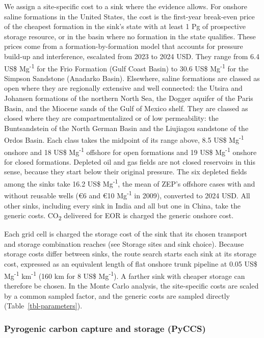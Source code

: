 \documentclass[
  letterpaper,
  twoside,
  twocolumn,
  9pt]{article}
\begin{document}
We assign a site-specific cost to a sink where the evidence allows. For
onshore saline formations in the United States, the cost is the
first-year break-even price of the cheapest formation in the sink's
state with at least 1 Pg of prospective storage resource, or in the
basin where no formation in the state qualifies. These prices come from
a formation-by-formation model that accounts for pressure build-up and
interference,\citep{netl2024scom} escalated from 2023 to 2024 USD. They
range from 6.4 US\$ Mg\textsuperscript{-1} for the Frio Formation (Gulf
Coast Basin) to 30.6 US\$ Mg\textsuperscript{-1} for the Simpson
Sandstone (Anadarko Basin). Elsewhere, saline formations are classed as
open where they are regionally extensive and well connected: the Utsira
and Johansen formations of the northern North Sea, the Dogger aquifer of
the Paris Basin, and the Miocene sands of the Gulf of Mexico shelf. They
are classed as closed where they are compartmentalized or of low
permeability: the Buntsandstein of the North German Basin and the
Liujiagou sandstone of the Ordos Basin. Each class takes the midpoint of
its range above, 8.5 US\$ Mg\textsuperscript{-1} onshore and 18 US\$
Mg\textsuperscript{-1} offshore for open formations and 19 US\$
Mg\textsuperscript{-1} onshore for closed formations. Depleted oil and
gas fields are not closed reservoirs in this sense, because they start
below their original pressure. The six depleted fields among the sinks
take 16.2 US\$ Mg\textsuperscript{-1}, the mean of ZEP's offshore cases
with and without reusable wells (€6 and €10 Mg\textsuperscript{-1} in
2009),\citep{zep2011} converted to 2024 USD. All other sinks, including
every sink in India and all but one in China, take the generic costs.
CO\textsubscript{2} delivered for EOR is charged the generic onshore
cost.

Each grid cell is charged the storage cost of the sink that its chosen
transport and storage combination reaches (see Storage sites and sink
choice). Because storage costs differ between sinks, the route search
starts each sink at its storage cost, expressed as an equivalent length
of flat onshore trunk pipeline at 0.05 US\$ Mg\textsuperscript{-1}
km\textsuperscript{-1} (160 km for 8 US\$ Mg\textsuperscript{-1}). A
farther sink with cheaper storage can therefore be chosen. In the Monte
Carlo analysis, the site-specific costs are scaled by a common sampled
factor, and the generic costs are sampled directly
(Table~\ref{tbl-parameters}).

\subsubsection{Pyrogenic carbon capture and storage
(PyCCS)}\label{pyrogenic-carbon-capture-and-storage-pyccs}
\end{document}
